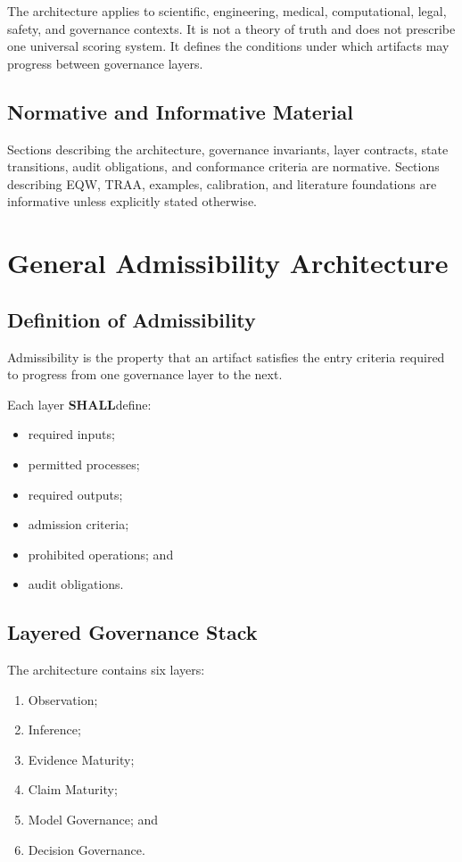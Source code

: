 \documentclass[11pt,a4paper]{article}
\newcommand{\shall}{\textbf{SHALL}}
\begin{document}
The architecture applies to scientific, engineering, medical, computational, legal, safety, and governance contexts. It is not a theory of truth and does not prescribe one universal scoring system. It defines the conditions under which artifacts may progress between governance layers.

\subsection{Normative and Informative Material}

Sections describing the architecture, governance invariants, layer contracts, state transitions, audit obligations, and conformance criteria are normative. Sections describing EQW, TRAA, examples, calibration, and literature foundations are informative unless explicitly stated otherwise.

\section{General Admissibility Architecture}

\subsection{Definition of Admissibility}

Admissibility is the property that an artifact satisfies the entry criteria required to progress from one governance layer to the next.

Each layer \shall define:

\begin{itemize}[leftmargin=*]
  \item required inputs;
  \item permitted processes;
  \item required outputs;
  \item admission criteria;
  \item prohibited operations; and
  \item audit obligations.
\end{itemize}

\subsection{Layered Governance Stack}

The architecture contains six layers:

\begin{enumerate}[leftmargin=*]
  \item Observation;
  \item Inference;
  \item Evidence Maturity;
  \item Claim Maturity;
  \item Model Governance; and
  \item Decision Governance.
\end{enumerate}
\end{document}
